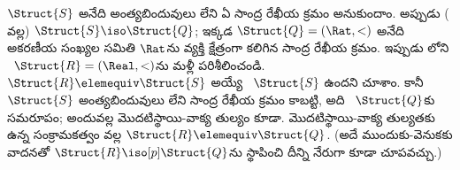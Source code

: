 \documentclass[../../../include/open-logic-section]{subfiles}
\begin{document}
\begin{rem}
  $\Struct{S}$ అనేది అంత్యబిందువులు లేని ఏ
   సాంద్ర రేఖీయ క్రమం అనుకుందాం.
  అప్పుడు ( వల్ల)
  $\Struct{S}\iso\Struct{Q}$; ఇక్కడ
  $\Struct{Q}=(\Rat,<)$ అనేది అకరణీయ సంఖ్యల సమితి $\Rat$ను వ్యక్తి క్షేత్రంగా కలిగిన  సాంద్ర రేఖీయ క్రమం.
  ఇప్పుడు లోని
  ~$\Struct{R}=(\Real,<)$ను మళ్లీ
  పరిశీలించండి. $\Struct{R}\elemequiv\Struct{S}$ అయ్యే
  ~$\Struct{S}$ ఉందని చూశాం. కానీ
  $\Struct{S}$ అంత్యబిందువులు లేని
   సాంద్ర రేఖీయ క్రమం కాబట్టి,
  అది ~$\Struct{Q}$కు సమరూపం; అందువల్ల
  మొదటిస్థాయి-వాక్య తుల్యం కూడా. మొదటిస్థాయి-వాక్య తుల్యతకు ఉన్న
  సంక్రామకత్వం వల్ల $\Struct{R}\elemequiv\Struct{Q}$.
  (అదే ముందుకు-వెనుకకు వాదనతో
  $\Struct{R}\iso[p]\Struct{Q}$ను స్థాపించి దీన్ని నేరుగా కూడా
  చూపవచ్చు.)
\end{rem}
\end{document}
